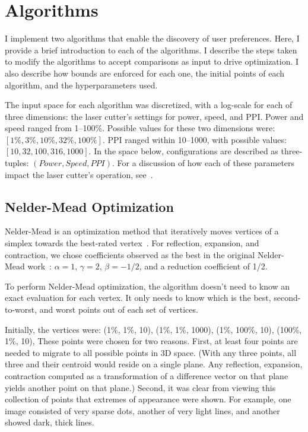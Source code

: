 \section{Algorithms}

I implement two algorithms that enable the discovery of user preferences.
Here, I provide a brief introduction to each of the algorithms.
I describe the steps taken to modify the algorithms to accept comparisons as input to drive optimization.
I also describe how bounds are enforced for each one, the initial points of each algorithm, and the hyperparameters used.

The input space for each algorithm was discretized, with a log-scale for each of three dimensions: the laser cutter's settings for power, speed, and PPI\@.
Power and speed ranged from 1--100\%.
Possible values for these two dimensions were:
$\left[1\%, 3\%, 10\%, 32\%, 100\%\right]$.
PPI ranged within 10--1000, with possible values:
$\left[10, 32, 100, 316, 1000\right]$.
In the space below, configurations are described as three-tuples:
$\left(Power, Speed, PPI\right)$.
For a discussion of how each of these parameters impact the laser cutter's operation, see~\cite{versalaser_2010}.

\subsection{Nelder-Mead Optimization}

Nelder-Mead is an optimization method that iteratively moves vertices of a simplex towards the best-rated vertex~\cite{nelder_simplex_1965}.
For reflection, expansion, and contraction, we chose coefficients observed as the best in the original Nelder-Mead work~\cite{nelder_simplex_1965}:
$\alpha=1$,
$\gamma=2$,
$\beta=-1/2$,
and a reduction coefficient of 1/2.

To perform Nelder-Mead optimization, the algorithm doesn't need to know an exact evaluation for each vertex.
It only needs to know which is the best, second-to-worst, and worst points out of each set of vertices.

Initially, the vertices were:
(1\%, 1\%, 10),
(1\%, 1\%, 1000),
(1\%, 100\%, 10),
(100\%, 1\%, 10),
These points were chosen for two reasons.
First, at least four points are needed to migrate to all possible points in 3D space.
(With any three points, all three and their centroid would reside on a single plane.
Any reflection, expansion, contraction computed as a transformation of a difference vector on that plane yields another point on that plane.)
Second, it was clear from viewing this collection of points that extremes of appearance were shown.
For example, one image consisted of very sparse dots, another of very light lines, and another showed dark, thick lines.

